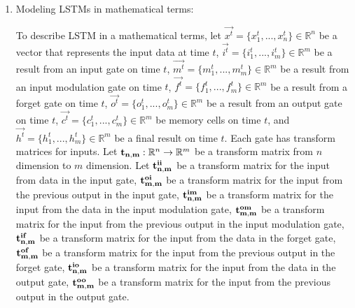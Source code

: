 \documentclass[draft,dvipsnames]{drexel-thesis}
\begin{document}
\begin{thesis}
\begin{enumerate}



\item Modeling LSTMs in mathematical terms:

	To describe LSTM in a mathematical terms, let $\vec{x^t} = \{ x_1^t, ..., x_n^t\} \in \mathbb{R}^n$ be a vector that represents the input data at time $t$, $\vec{i^t} = \{i_1^t, ..., i_m^t\} \in \mathbb{R}^m$ be a result from an input gate on time $t$, $\vec{m^t} = \{m_1^t, ..., m_m^t\} \in \mathbb{R}^m$ be a result from an input modulation gate on time $t$, $\vec{f^t} = \{f_1^t, ..., f_m^t\} \in \mathbb{R}^m$ be a result from a forget gate on time $t$, $\vec{o^t} = \{o_1^t, ..., o_m^t\} \in \mathbb{R}^m$ be a result from an output gate on time $t$, $\vec{c^t} = \{c_1^t, ..., c_m^t\} \in \mathbb{R}^m$ be memory cells on time $t$, and $\vec{h^t} = \{h_1^t, ..., h_m^t\} \in \mathbb{R}^m$ be a final result on time $t$.
Each gate has transform matrices for inputs. Let $\bold{t_{n,m}}: \mathbb{R}^n \rightarrow \mathbb{R}^m$ be a transform matrix from $n$ dimension to $m$ dimension. Let $\bold{t_{n,m}^{ii}}$ be a transform matrix for the input from data in the input gate, $\bold{t_{m,m}^{oi}}$ be a transform matrix for the input from the previous output in the input gate, $\bold{t_{n,m}^{im}}$ be a transform matrix for the input from the data in the input modulation gate, $\bold{t_{m,m}^{om}}$ be a transform matrix for the input from the previous output in the input modulation gate, $\bold{t_{n,m}^{if}}$ be a transform matrix for the input from the data in the forget gate, $\bold{t_{m,m}^{of}}$ be a transform matrix for the input from the previous output in the forget gate, $\bold{t_{n,m}^{io}}$ be a transform matrix for the input from the data in the output gate, $\bold{t_{m,m}^{oo}}$ be a transform matrix for the input from the previous output in the output gate.


\end{enumerate}
\end{thesis}
\end{document}
